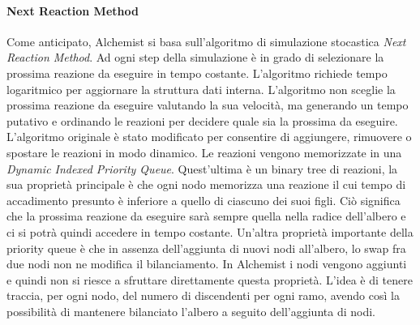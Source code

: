\documentclass[12pt,a4paper,openright,twoside]{book}
\begin{document}
\paragraph{Next Reaction Method}
Come anticipato, Alchemist si basa sull'algoritmo di simulazione stocastica \textit{Next Reaction Method}. Ad ogni step della simulazione è in grado di selezionare la prossima reazione da eseguire in tempo costante. L'algoritmo richiede tempo logaritmico per aggiornare la struttura dati interna. L'algoritmo non sceglie la prossima reazione da eseguire valutando la sua velocità, ma generando un tempo putativo e ordinando le reazioni per decidere quale sia la prossima da eseguire. L'algoritmo originale è stato modificato per consentire di aggiungere, rimuovere o spostare le reazioni in modo dinamico. 
Le reazioni vengono memorizzate in una \textit{Dynamic Indexed Priority Queue}. Quest'ultima è un binary tree di reazioni, la sua proprietà principale è che ogni nodo memorizza una reazione il cui tempo di accadimento presunto è inferiore a quello di ciascuno dei suoi figli. Ciò significa che la prossima reazione da eseguire sarà sempre quella nella radice dell'albero e ci si potrà quindi accedere in tempo costante. 
Un'altra proprietà importante della priority queue è che in assenza dell'aggiunta di nuovi nodi all'albero, lo swap fra due nodi non ne modifica il bilanciamento. 
In Alchemist i nodi vengono aggiunti e quindi non si riesce a sfruttare direttamente questa proprietà. L'idea è di tenere traccia, per ogni nodo, del numero di discendenti per ogni ramo, avendo così la possibilità di mantenere bilanciato l'albero a seguito dell'aggiunta di nodi. 
\end{document}
